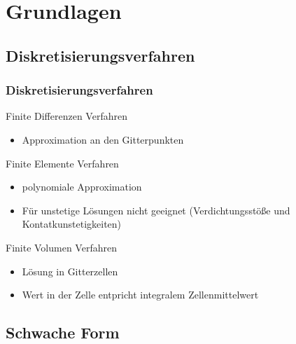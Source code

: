 \documentclass[
	11pt, %
	aspectratio=169, %
]{beamer}
\begin{document}
\section{Grundlagen} %

\subsection{Diskretisierungsverfahren}

\begin{frame}

	\frametitle{Diskretisierungsverfahren}
	
	Finite Differenzen Verfahren
	\begin{itemize}
		\item Approximation an den Gitterpunkten
	\end{itemize}
	\smallskip
	Finite Elemente Verfahren
	\begin{itemize}
		\item polynomiale Approximation
		\item Für unstetige Lösungen nicht geeignet (Verdichtungsstöße und Kontatkunstetigkeiten)
	\end{itemize}
	\smallskip
	Finite Volumen Verfahren
	\begin{itemize}
		\item Lösung in Gitterzellen
		\item Wert in der Zelle entpricht integralem Zellenmittelwert
	\end{itemize}

\end{frame}

\subsection{Schwache Form}
\end{document}
